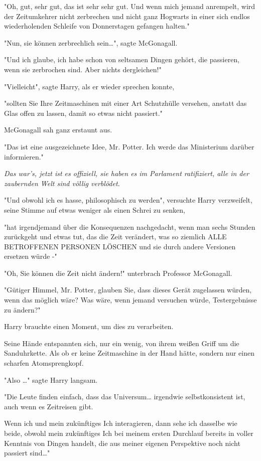 {"Oh, gut, sehr gut, das ist sehr sehr gut. Und wenn mich jemand anrempelt, wird der Zeitumkehrer nicht zerbrechen und nicht ganz Hogwarts in einer sich endlos wiederholenden Schleife von Donnerstagen gefangen halten."

"Nun, sie können zerbrechlich sein…", sagte McGonagall.

"Und ich glaube, ich habe schon von seltsamen Dingen gehört, die passieren, wenn sie zerbrochen sind. Aber nichts dergleichen!"

"Vielleicht", sagte Harry, als er wieder sprechen konnte,

"sollten Sie Ihre Zeitmaschinen mit einer Art Schutzhülle versehen, anstatt das Glas offen zu lassen, damit so etwas nicht passiert."

McGonagall sah ganz erstaunt aus.

"Das ist eine ausgezeichnete Idee, Mr. Potter. Ich werde das Ministerium darüber informieren."

\emph{Das war's, jetzt ist es offiziell, sie haben es im Parlament ratifiziert, alle in der zaubernden Welt sind völlig verblödet.}

"Und obwohl ich es hasse, philosophisch zu werden", versuchte Harry verzweifelt, seine Stimme auf etwas weniger als einen Schrei zu senken,

"hat irgendjemand über die Konsequenzen nachgedacht, wenn man sechs Stunden zurückgeht und etwas tut, das die Zeit verändert, was so ziemlich ALLE BETROFFENEN PERSONEN LÖSCHEN und sie durch andere Versionen ersetzen würde -"

"Oh, Sie können die Zeit nicht ändern!" unterbrach Professor McGonagall.

"Gütiger Himmel, Mr. Potter, glauben Sie, dass dieses Gerät zugelassen würden, wenn das möglich wäre? Was wäre, wenn jemand versuchen würde, Testergebnisse zu ändern?"

Harry brauchte einen Moment, um dies zu verarbeiten.

Seine Hände entspannten sich, nur ein wenig, von ihrem weißen Griff um die Sanduhrkette. Als ob er keine Zeitmaschine in der Hand hätte, sondern nur einen scharfen Atomsprengkopf.

"Also …" sagte Harry langsam.

"Die Leute finden einfach, dass das Universum… irgendwie selbstkonsistent ist, auch wenn es Zeitreisen gibt.

Wenn ich und mein zukünftiges Ich interagieren, dann sehe ich dasselbe wie beide, obwohl mein zukünftiges Ich bei meinem ersten Durchlauf bereits in voller Kenntnis von Dingen handelt, die aus meiner eigenen Perspektive noch nicht passiert sind…"

}
